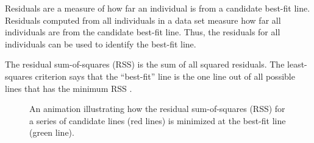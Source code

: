 \documentclass[10pt,openany]{book}\usepackage[]{graphicx}\usepackage[]{color}
\newenvironment{knitrout}{}{} %
\begin{document}
Residuals are a measure of how far an individual is from a candidate best-fit line. Residuals computed from all individuals in a data set measure how far all individuals are from the candidate best-fit line. Thus, the residuals for all individuals can be used to identify the best-fit line.

The residual sum-of-squares (RSS) is the sum of all squared residuals. The least-squares criterion says that the ``best-fit'' line is the one line out of all possible lines that has the minimum RSS .

\begin{knitrout}
\color{fgcolor}









































































\begin{figure}[hbtp]

{\centering {}

}

\caption[An animation illustrating how the residual sum-of-squares (RSS) for a series of candidate lines (red lines) is minimized at the best-fit line (green line)]{An animation illustrating how the residual sum-of-squares (RSS) for a series of candidate lines (red lines) is minimized at the best-fit line (green line).}\label{fig:RSSanim}
\end{figure}


\end{knitrout}
\end{document}
